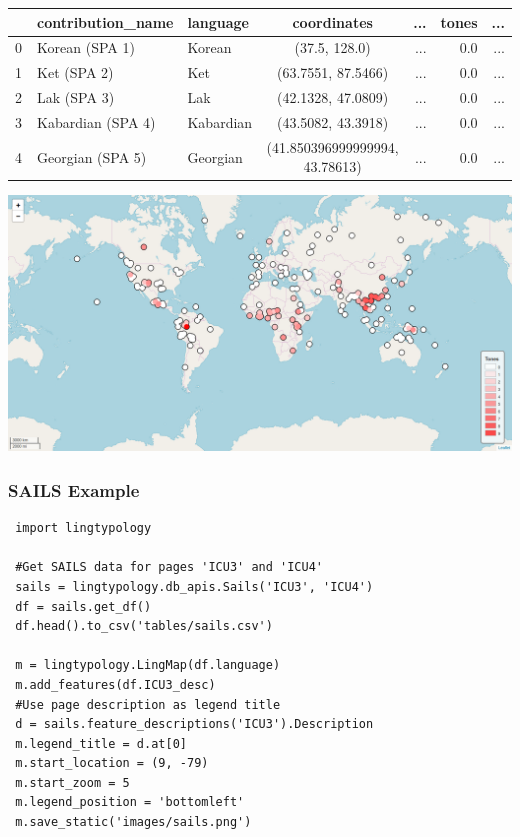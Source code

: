 \documentclass[a4paper,12pt]{article}
\begin{document}
\noindent
\begin{minipage}{\textwidth}
\begin{adjustbox}{max width=\textwidth}
\begin{tabular}{ l | l | l | c | r | r | r }
    ~ & contribution\_name & language & coordinates & ... & tones & ... \\
    \hline
    0 & Korean (SPA 1) & Korean & (37.5, 128.0) & ... & 0.0 & ... \\
    1 & Ket (SPA 2) & Ket & (63.7551, 87.5466) & ... & 0.0 & ... \\
    2 & Lak (SPA 3) & Lak & (42.1328, 47.0809) & ... & 0.0 & ... \\
    3 & Kabardian (SPA 4) & Kabardian & (43.5082, 43.3918) & ... & 0.0 & ... \\
    4 & Georgian (SPA 5) & Georgian & (41.850396999999994, 43.78613) & ... & 0.0 & ... \\
\end{tabular}
\end{adjustbox}
\end{minipage}

\bigskip
\noindent
\begin{minipage}{\textwidth}
\includegraphics[width=\textwidth]{images/phoible.png}
\end{minipage}

\subsubsection{SAILS Example}

\noindent
\begin{minipage}{\textwidth}
\begin{lstlisting}
 import lingtypology
 
 #Get SAILS data for pages 'ICU3' and 'ICU4'
 sails = lingtypology.db_apis.Sails('ICU3', 'ICU4')
 df = sails.get_df()
 df.head().to_csv('tables/sails.csv')
 
 m = lingtypology.LingMap(df.language)
 m.add_features(df.ICU3_desc)
 #Use page description as legend title
 d = sails.feature_descriptions('ICU3').Description
 m.legend_title = d.at[0]
 m.start_location = (9, -79)
 m.start_zoom = 5
 m.legend_position = 'bottomleft'
 m.save_static('images/sails.png')
\end{lstlisting}
\end{minipage}
\end{document}
